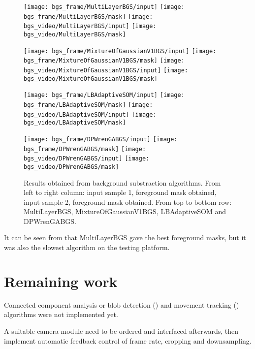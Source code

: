 \begin{figure}[H]
  \centering
  \texttt{[image: bgs\_frame/MultiLayerBGS/input]}
  \texttt{[image: bgs\_frame/MultiLayerBGS/mask]}
  \texttt{[image: bgs\_video/MultiLayerBGS/input]}
  \texttt{[image: bgs\_video/MultiLayerBGS/mask]}

  \texttt{[image: bgs\_frame/MixtureOfGaussianV1BGS/input]}
  \texttt{[image: bgs\_frame/MixtureOfGaussianV1BGS/mask]}
  \texttt{[image: bgs\_video/MixtureOfGaussianV1BGS/input]}
  \texttt{[image: bgs\_video/MixtureOfGaussianV1BGS/mask]}

  \texttt{[image: bgs\_frame/LBAdaptiveSOM/input]}
  \texttt{[image: bgs\_frame/LBAdaptiveSOM/mask]}
  \texttt{[image: bgs\_video/LBAdaptiveSOM/input]}
  \texttt{[image: bgs\_video/LBAdaptiveSOM/mask]}

  \texttt{[image: bgs\_frame/DPWrenGABGS/input]}
  \texttt{[image: bgs\_frame/DPWrenGABGS/mask]}
  \texttt{[image: bgs\_video/DPWrenGABGS/input]}
  \texttt{[image: bgs\_video/DPWrenGABGS/mask]}
  \caption{Results obtained from background substraction algorithms. From left to right column: input sample 1, foreground mask obtained, input sample 2, foreground mask obtained. From top to bottom row: MultiLayerBGS, MixtureOfGaussianV1BGS, LBAdaptiveSOM and DPWrenGABGS.}
  \label{Figure:bgs_frame}
\end{figure}

It can be seen from  that MultiLayerBGS gave the best foreground masks, but it was also the slowest algorithm on the testing platform.

\section{Remaining work}

Connected component analysis or blob detection () and movement tracking () algorithms were not implemented yet.

A suitable camera module need to be ordered and interfaced afterwards, then implement automatic feedback control of frame rate, cropping and downsampling.
